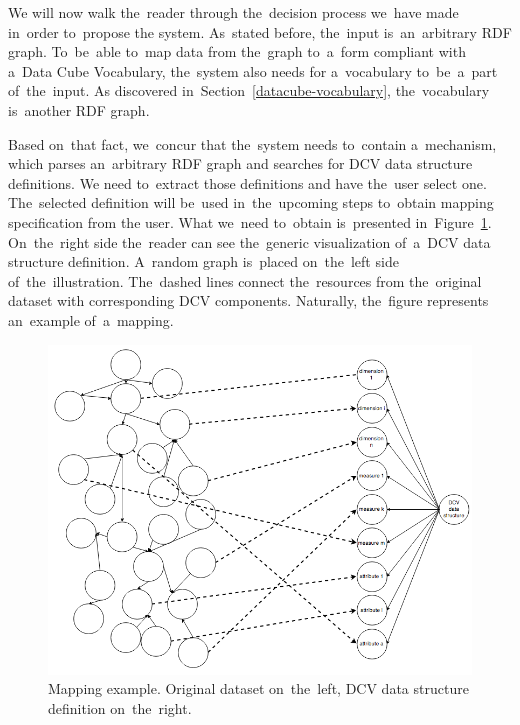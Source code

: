 We will now walk the~reader through the~decision process we~have made in~order to~propose 
the system. As~stated before, the~input is~an~arbitrary RDF graph. To~be~able to~map data from the~graph to~a~form compliant with a~Data 
Cube Vocabulary, the~system also needs for a~vocabulary to~be~a~part of~the~input. 
As discovered in~Section~\ref{datacube-vocabulary}, the~vocabulary is~another 
RDF graph.

Based on~that fact, we~concur that the~system needs to~contain a~mechanism, which 
parses an~arbitrary RDF graph and searches for DCV data structure definitions. 
We need to~extract those definitions and have the~user select one. The~selected 
definition will be~used in~the~upcoming steps to~obtain mapping specification from 
the user. What we~need to~obtain is~presented in~Figure~\ref{fig:mapping-example}. On~the~right side the~reader can see the~generic visualization of~a~DCV data structure definition. A~random graph is~placed on~the~left side of~the~illustration. The~dashed lines connect the~resources 
from the~original dataset with corresponding DCV components. Naturally, the~figure represents an~example of~a~mapping.

\begin{figure}
	\centering
	\includegraphics[width=140mm]{img/mapping-example.png}
	\caption{Mapping example. Original dataset on~the~left, DCV data structure definition on~the~right.}
	\label{fig:mapping-example}
\end{figure}


